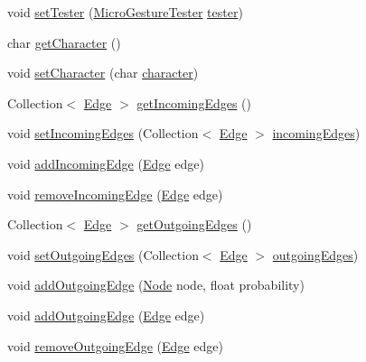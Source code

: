 \begin{DoxyCompactItemize}
\item 
void \hyperlink{classch_1_1zhaw_1_1ba10__bsha__1_1_1graph_1_1Node_a6dcb93d4c25e370c84741db17e59d2af}{setTester} (\hyperlink{classch_1_1zhaw_1_1ba10__bsha__1_1_1service_1_1MicroGestureTester}{MicroGestureTester} \hyperlink{classch_1_1zhaw_1_1ba10__bsha__1_1_1graph_1_1Node_abec03ba4df889f23c0d30d70edee59f6}{tester})
\item 
char \hyperlink{classch_1_1zhaw_1_1ba10__bsha__1_1_1graph_1_1Node_a0e84a9cb9ac03506d3a46af0a8f288f5}{getCharacter} ()
\item 
void \hyperlink{classch_1_1zhaw_1_1ba10__bsha__1_1_1graph_1_1Node_ad1c94b7c86ad5fd14bf0aee9d52189e4}{setCharacter} (char \hyperlink{classch_1_1zhaw_1_1ba10__bsha__1_1_1graph_1_1Node_ab6bd424b381dc0f19d9f49d0b2cb56fc}{character})
\item 
Collection$<$ \hyperlink{classch_1_1zhaw_1_1ba10__bsha__1_1_1graph_1_1Edge}{Edge} $>$ \hyperlink{classch_1_1zhaw_1_1ba10__bsha__1_1_1graph_1_1Node_a315d8069f8d2d0b8d50bbc2b5e57144b}{getIncomingEdges} ()
\item 
void \hyperlink{classch_1_1zhaw_1_1ba10__bsha__1_1_1graph_1_1Node_a18364ede156d636e492a64eeb5306d36}{setIncomingEdges} (Collection$<$ \hyperlink{classch_1_1zhaw_1_1ba10__bsha__1_1_1graph_1_1Edge}{Edge} $>$ \hyperlink{classch_1_1zhaw_1_1ba10__bsha__1_1_1graph_1_1Node_a588bea1c6cceb5f66e5e25115b9b12be}{incomingEdges})
\item 
void \hyperlink{classch_1_1zhaw_1_1ba10__bsha__1_1_1graph_1_1Node_afbf20aec55572fc6c90d2f2541d7eeed}{addIncomingEdge} (\hyperlink{classch_1_1zhaw_1_1ba10__bsha__1_1_1graph_1_1Edge}{Edge} edge)
\item 
void \hyperlink{classch_1_1zhaw_1_1ba10__bsha__1_1_1graph_1_1Node_aa309007d5babe035612662009aa65471}{removeIncomingEdge} (\hyperlink{classch_1_1zhaw_1_1ba10__bsha__1_1_1graph_1_1Edge}{Edge} edge)
\item 
Collection$<$ \hyperlink{classch_1_1zhaw_1_1ba10__bsha__1_1_1graph_1_1Edge}{Edge} $>$ \hyperlink{classch_1_1zhaw_1_1ba10__bsha__1_1_1graph_1_1Node_a6261a952f89dfff7e010c3ddc4a730d8}{getOutgoingEdges} ()
\item 
void \hyperlink{classch_1_1zhaw_1_1ba10__bsha__1_1_1graph_1_1Node_add712262f47c24d3af3b3fa4150566e1}{setOutgoingEdges} (Collection$<$ \hyperlink{classch_1_1zhaw_1_1ba10__bsha__1_1_1graph_1_1Edge}{Edge} $>$ \hyperlink{classch_1_1zhaw_1_1ba10__bsha__1_1_1graph_1_1Node_a130b2d1b8b68b2fe91d3753b23c766e2}{outgoingEdges})
\item 
void \hyperlink{classch_1_1zhaw_1_1ba10__bsha__1_1_1graph_1_1Node_aeb5d29fd379ad2b13cadbac51f880390}{addOutgoingEdge} (\hyperlink{classch_1_1zhaw_1_1ba10__bsha__1_1_1graph_1_1Node}{Node} node, float probability)
\item 
void \hyperlink{classch_1_1zhaw_1_1ba10__bsha__1_1_1graph_1_1Node_aeb360f45f8582ea6cda8ef9b6f074df0}{addOutgoingEdge} (\hyperlink{classch_1_1zhaw_1_1ba10__bsha__1_1_1graph_1_1Edge}{Edge} edge)
\item 
void \hyperlink{classch_1_1zhaw_1_1ba10__bsha__1_1_1graph_1_1Node_ad31d9211d2a1fa2984f02f2faa37c6f1}{removeOutgoingEdge} (\hyperlink{classch_1_1zhaw_1_1ba10__bsha__1_1_1graph_1_1Edge}{Edge} edge)
\end{DoxyCompactItemize}
